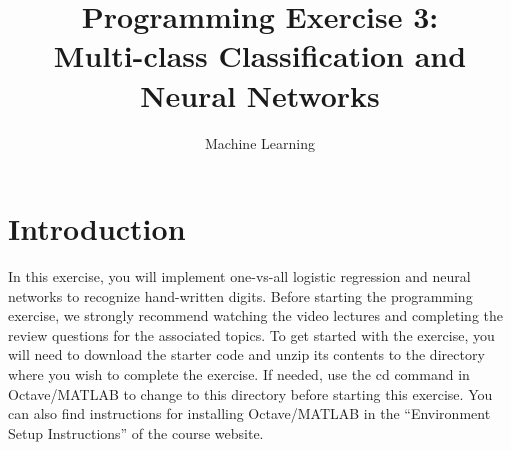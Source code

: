 \documentclass[12pt, a4paper]{article} %
\title{\noindent Programming Exercise 3: \\ Multi-class Classification and Neural Networks}
\begin{document}
\date{}
\author{Machine Learning}
\maketitle


\section*{Introduction}

In this exercise, you will implement one-vs-all logistic regression and neural networks to recognize hand-written digits. Before starting the programming exercise, we strongly recommend watching the video lectures and completing the review questions for the associated topics.
To get started with the exercise, you will need to download the starter code and unzip its contents to the directory where you wish to complete the exercise. If needed, use the cd command in Octave/MATLAB to change to this directory before starting this exercise.
You can also find instructions for installing Octave/MATLAB in the “Environment Setup Instructions” of the course website.
\end{document}
